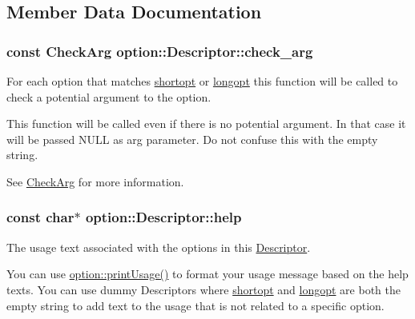 \subsection{\-Member \-Data \-Documentation}
\hypertarget{structoption_1_1_descriptor_aa5d675dba0214a4abd73007ff163cc67}{
\subsubsection[{check\-\_\-arg}]{\setlength{\rightskip}{0pt plus 5cm}const {\bf \-Check\-Arg} {\bf option\-::\-Descriptor\-::check\-\_\-arg}}}\label{structoption_1_1_descriptor_aa5d675dba0214a4abd73007ff163cc67}


\-For each option that matches \hyperlink{structoption_1_1_descriptor_a0dba4ccca59c19d6ed4081391fca5adb}{shortopt} or \hyperlink{structoption_1_1_descriptor_a470c449dfa894c9bfda2dae026142b4b}{longopt} this function will be called to check a potential argument to the option. 

\-This function will be called even if there is no potential argument. \-In that case it will be passed {\ttfamily \-N\-U\-L\-L} as {\ttfamily arg} parameter. \-Do not confuse this with the empty string.

\-See \hyperlink{namespaceoption_a4afb7f04597f34439679509baf4b6d39}{\-Check\-Arg} for more information. \hypertarget{structoption_1_1_descriptor_a9045b19311533e1b8a08645d57149c79}{
\subsubsection[{help}]{\setlength{\rightskip}{0pt plus 5cm}const char$\ast$ {\bf option\-::\-Descriptor\-::help}}}\label{structoption_1_1_descriptor_a9045b19311533e1b8a08645d57149c79}


\-The usage text associated with the options in this \hyperlink{structoption_1_1_descriptor}{\-Descriptor}. 

\-You can use \hyperlink{namespaceoption_afc8bb7e040a98a0b33ff1ce9da1be0d1}{option\-::print\-Usage()} to format your usage message based on the {\ttfamily help} texts. \-You can use dummy \-Descriptors where \hyperlink{structoption_1_1_descriptor_a0dba4ccca59c19d6ed4081391fca5adb}{shortopt} and \hyperlink{structoption_1_1_descriptor_a470c449dfa894c9bfda2dae026142b4b}{longopt} are both the empty string to add text to the usage that is not related to a specific option.

